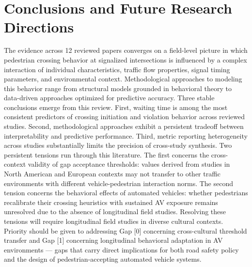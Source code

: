 \documentclass{article}
\begin{document}
\section{Conclusions and Future Research Directions}
The evidence across 12 reviewed papers converges on a field-level picture in which pedestrian crossing behavior at signalized intersections is influenced by a complex interaction of individual characteristics, traffic flow properties, signal timing parameters, and environmental context. Methodological approaches to modeling this behavior range from structural models grounded in behavioral theory to data-driven approaches optimized for predictive accuracy. Three stable conclusions emerge from this review. First, waiting time is among the most consistent predictors of crossing initiation and violation behavior across reviewed studies. Second, methodological approaches exhibit a persistent tradeoff between interpretability and predictive performance. Third, metric reporting heterogeneity across studies substantially limits the precision of cross-study synthesis. Two persistent tensions run through this literature. The first concerns the cross-context validity of gap acceptance thresholds: values derived from studies in North American and European contexts may not transfer to other traffic environments with different vehicle-pedestrian interaction norms. The second tension concerns the behavioral effects of automated vehicles: whether pedestrians recalibrate their crossing heuristics with sustained AV exposure remains unresolved due to the absence of longitudinal field studies. Resolving these tensions will require longitudinal field studies in diverse cultural contexts. Priority should be given to addressing Gap [0] concerning cross-cultural threshold transfer and Gap [1] concerning longitudinal behavioral adaptation in AV environments — gaps that carry direct implications for both road safety policy and the design of pedestrian-accepting automated vehicle systems.
\end{document}
